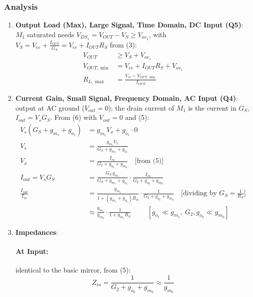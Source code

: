 \subsubsection{Analysis}
\begin{enumerate}
  \item \textbf{Output Load (Max), Large Signal, Time Domain, DC Input (Q5)}:
    \(M_1\) saturated needs \(V_{DS_1} = V_{OUT} - V_S \geq V_{ov_1}\), with
    \(V_S = V_{ee} + \frac{I_{OUT}}{G_S} = V_{ee} + I_{OUT} R_S\) from (3):
    \begin{align*}
      V_{OUT} &\geq V_S + V_{ov_1} \\
      V_{OUT,\min} &= V_{ee} + I_{OUT} R_S + V_{ov_1} \\
      R_{L,\max} &= \frac{V_{cc} - V_{OUT,\min}}{I_{OUT}}
    \end{align*}
  \item \textbf{Current Gain, Small Signal, Frequency Domain, AC Input (Q4)}:
    output at AC ground (\(V_{out} = 0\)); the drain current of \(M_1\) is
    the current in \(G_S\), \(I_{out} = V_s G_S\). From (6) with \(V_{out} = 0\) and (5):
    \begin{align*}
      V_s (G_S + g_{m_1} + g_{o_1}) &= g_{m_1} V_x + g_{o_1} \cdot 0 \\
      V_s &= \frac{g_{m_1} V_x}{G_S + g_{m_1} + g_{o_1}} \\
      V_x &= \frac{I_{in}}{G_2 + g_{o_0} + g_{m_0}} \quad \text{[from (5)]} \\
      I_{out} = V_s G_S &= \frac{G_S\, g_{m_1}}{G_S + g_{m_1} + g_{o_1}} \cdot \frac{I_{in}}{G_2 + g_{o_0} + g_{m_0}} \\
      \frac{I_{out}}{I_{in}} &= \frac{g_{m_1}}{1 + (g_{m_1} + g_{o_1}) R_S} \cdot \frac{1}{G_2 + g_{o_0} + g_{m_0}} \quad \text{[dividing by } G_S = \tfrac{1}{R_S} \text{]} \\
                             &\approx \frac{g_{m_1}}{g_{m_0}} \cdot \frac{1}{1 + g_{m_1} R_S} \hspace{1cm} [g_{o_1} \ll g_{m_1},\ G_2, g_{o_0} \ll g_{m_0}]
    \end{align*}
  \item \textbf{Impedances}:
    \paragraph{At Input:} identical to the basic mirror, from (5):
      \[
        Z_{in} = \frac{1}{G_2 + g_{o_0} + g_{m_0}} \approx \frac{1}{g_{m_0}}
      \]

\end{enumerate}
